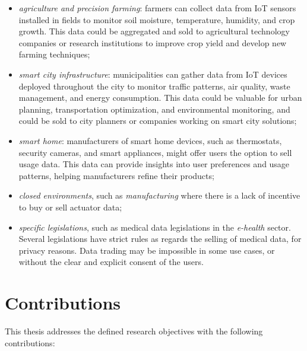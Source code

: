 \begin{itemize}
    \item \emph{agriculture and precision farming}: farmers can collect data from IoT sensors installed in fields to monitor soil moisture, temperature, humidity, and crop growth. This data could be aggregated and sold to agricultural technology companies or research institutions to improve crop yield and develop new farming techniques;
    \item \emph{smart city infrastructure}: municipalities can gather data from IoT devices deployed throughout the city to monitor traffic patterns, air quality, waste management, and energy consumption. This data could be valuable for urban planning, transportation optimization, and environmental monitoring, and could be sold to city planners or companies working on smart city solutions;
    \item \emph{smart home}: manufacturers of smart home devices, such as thermostats, security cameras, and smart appliances, might offer users the option to sell usage data. This data can provide insights into user preferences and usage patterns, helping manufacturers refine their products;
\end{itemize}
\begin{itemize}
    \item \emph{closed environments}, such as \emph{manufacturing} where there is a lack of incentive to buy or sell actuator data; 
    \item \emph{specific legislations}, such as medical data legislations in the \emph{e-health} sector. Several legislations have strict rules as regards the selling of medical data, for privacy reasons. Data trading may be impossible in some use cases, or without the clear and explicit consent of the users.
\end{itemize} 

\section{Contributions}

This thesis addresses the defined research objectives with the following contributions:

